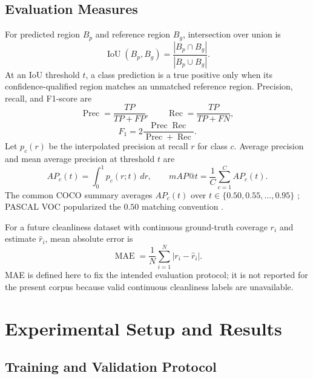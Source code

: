 \documentclass[conference]{IEEEtran}
\begin{document}
\subsection{Evaluation Measures}

For predicted region $B_p$ and reference region $B_g$, intersection over union is
\begin{equation}
    \operatorname{IoU}(B_p,B_g)=
    \frac{|B_p\cap B_g|}{|B_p\cup B_g|}.
    \label{eq:iou}
\end{equation}
At an IoU threshold $t$, a class prediction is a true positive only when its confidence-qualified region matches an unmatched reference region. Precision, recall, and F1-score are
\begin{equation}
    \operatorname{Prec}=\frac{TP}{TP+FP},\qquad
    \operatorname{Rec}=\frac{TP}{TP+FN},
    \label{eq:pr}
\end{equation}
\begin{equation}
    F_1=2\frac{\operatorname{Prec}\operatorname{Rec}}
    {\operatorname{Prec}+\operatorname{Rec}}.
    \label{eq:f1}
\end{equation}
Let $p_c(r)$ be the interpolated precision at recall $r$ for class $c$. Average precision and mean average precision at threshold $t$ are
\begin{equation}
    AP_c(t)=\int_{0}^{1}p_c(r;t)\,dr,
    \qquad
    mAP@t=\frac{1}{C}\sum_{c=1}^{C}AP_c(t).
    \label{eq:map}
\end{equation}
The common COCO summary averages $AP_c(t)$ over $t\in\{0.50,0.55,\ldots,0.95\}$ \cite{lin2014coco}; PASCAL VOC popularized the $0.50$ matching convention \cite{everingham2010}.

For a future cleanliness dataset with continuous ground-truth coverage $r_i$ and estimate $\hat{r}_i$, mean absolute error is
\begin{equation}
    \operatorname{MAE}=\frac{1}{N}\sum_{i=1}^{N}|r_i-\hat{r}_i|.
    \label{eq:mae}
\end{equation}
MAE is defined here to fix the intended evaluation protocol; it is not reported for the present corpus because valid continuous cleanliness labels are unavailable.

\section{Experimental Setup and Results}

\subsection{Training and Validation Protocol}
\end{document}

